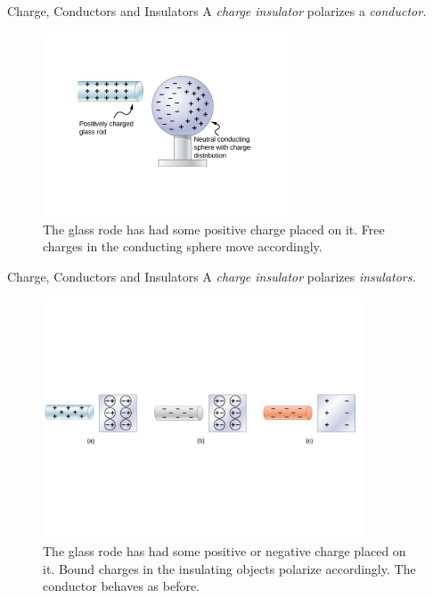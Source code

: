 \documentclass{beamer}
\begin{document}
\begin{frame}{Charge, Conductors and Insulators}
A \textit{charge insulator} polarizes a \textit{conductor.}
\begin{figure}
\centering
\includegraphics[width=0.65\textwidth]{figures/chargesphere.pdf}
\caption{\label{fig:chargsphere} The glass rode has had some positive charge placed on it.  Free charges in the conducting sphere move accordingly.}
\end{figure}
\end{frame}

\begin{frame}{Charge, Conductors and Insulators}
\small
A \textit{charge insulator} polarizes \textit{insulators.}
\begin{figure}
\centering
\includegraphics[width=0.85\textwidth,trim=0cm 5cm 0cm 5cm,clip=true]{figures/chargesphere2.pdf}
\caption{\label{fig:chargsphere2} The glass rode has had some positive or negative charge placed on it.  Bound charges in the insulating objects polarize accordingly.  The conductor behaves as before.}
\end{figure}
\end{frame}
\end{document}
